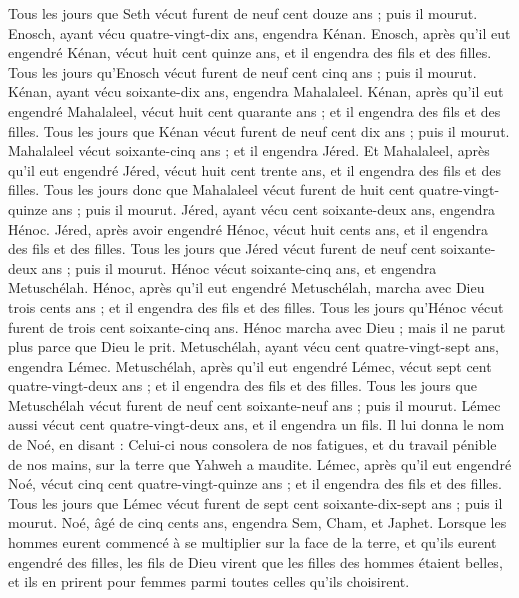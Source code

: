 \begin{multicols}{2}
Tous les jours que Seth vécut furent de neuf cent douze ans ; puis il mourut.
Enosch, ayant vécu quatre-vingt-dix ans, engendra Kénan.
Enosch, après qu'il eut engendré Kénan, vécut huit cent quinze ans, et il engendra des fils et des filles.
Tous les jours qu'Enosch vécut furent de neuf cent cinq ans ; puis il mourut.
Kénan, ayant vécu soixante-dix ans, engendra Mahalaleel.
Kénan, après qu'il eut engendré Mahalaleel, vécut huit cent quarante ans ; et il engendra des fils et des filles.
Tous les jours que Kénan vécut furent de neuf cent dix ans ; puis il mourut.
Mahalaleel vécut soixante-cinq ans ; et il engendra Jéred.
Et Mahalaleel, après qu'il eut engendré Jéred, vécut huit cent trente ans, et il engendra des fils et des filles.
Tous les jours donc que Mahalaleel vécut furent de huit cent quatre-vingt-quinze ans ; puis il mourut.
Jéred, ayant vécu cent soixante-deux ans, engendra Hénoc.
Jéred, après avoir engendré Hénoc, vécut huit cents ans, et il engendra des fils et des filles.
Tous les jours que Jéred vécut furent de neuf cent soixante-deux ans ; puis il mourut.
Hénoc vécut soixante-cinq ans, et engendra Metuschélah.
Hénoc, après qu'il eut engendré Metuschélah, marcha avec Dieu trois cents ans ; et il engendra des fils et des filles.
Tous les jours qu'Hénoc vécut furent de trois cent soixante-cinq ans.
Hénoc marcha avec Dieu ; mais il ne parut plus parce que Dieu le prit.
Metuschélah, ayant vécu cent quatre-vingt-sept ans, engendra Lémec.
Metuschélah, après qu'il eut engendré Lémec, vécut sept cent quatre-vingt-deux ans ; et il engendra des fils et des filles.
Tous les jours que Metuschélah vécut furent de neuf cent soixante-neuf ans ; puis il mourut.
Lémec aussi vécut cent quatre-vingt-deux ans, et il engendra un fils.
Il lui donna le nom de Noé, en disant : Celui-ci nous consolera de nos fatigues, et du travail pénible de nos mains, sur la terre que Yahweh a maudite.
Lémec, après qu'il eut engendré Noé, vécut cinq cent quatre-vingt-quinze ans ; et il engendra des fils et des filles.
Tous les jours que Lémec vécut furent de sept cent soixante-dix-sept ans ; puis il mourut.
Noé, âgé de cinq cents ans, engendra Sem, Cham, et Japhet.
\VerseOne{}Lorsque les hommes eurent commencé à se multiplier sur la face de la terre, et qu'ils eurent engendré des filles,
les fils de Dieu virent que les filles des hommes étaient belles, et ils en prirent pour femmes parmi toutes celles qu'ils choisirent.

\end{multicols}
